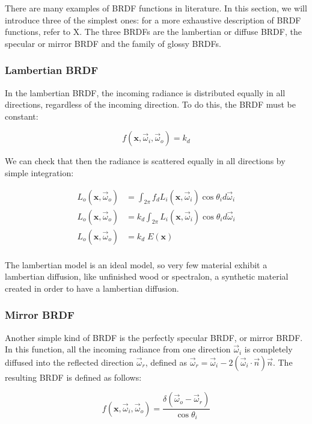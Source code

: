 There are many examples of BRDF functions in literature. In this section, we will introduce three of the simplest ones: for a more exhaustive description of BRDF functions, refer to X. The three BRDFs are the lambertian or diffuse BRDF, the specular or mirror BRDF and the family of glossy BRDFs.

\subsubsection{Lambertian BRDF}

In the lambertian BRDF, the incoming radiance is distributed equally in all directions, regardless of the incoming direction. To do this, the BRDF must be constant:

$$
f(\mathbf{x}, \vec{\omega}_i, \vec{\omega}_o) = k_d
$$

We can check that then the radiance is scattered equally in all directions by simple integration:

\begin{equation*}
\begin{split}
L_o(\mathbf{x}, \vec{\omega}_o) &= \int_{2\pi} f_d L_i(\mathbf{x}, \vec{\omega}_i) \cos\theta_i d\vec{\omega}_i \\
L_o(\mathbf{x}, \vec{\omega}_o) &= k_d \int_{2\pi} L_i(\mathbf{x}, \vec{\omega}_i) \cos\theta_i d\vec{\omega}_i \\
L_o(\mathbf{x}, \vec{\omega}_o) &= k_d \; E(\mathbf{x}) \\
\end{split}
\end{equation*}

The lambertian model is an ideal model, so very few material exhibit a lambertian diffusion, like unfinished wood or spectralon, a synthetic material created in order to have a lambertian diffusion. 

\subsubsection{Mirror BRDF}

Another simple kind of BRDF is the perfectly specular BRDF, or mirror BRDF. In this function, all the incoming radiance from one direction $\vec{\omega}_i$ is completely diffused into the reflected direction $\vec{\omega}_r$, defined as $\vec{\omega}_r = \vec{\omega}_i - 2 (\vec{\omega}_i \cdot \vec{n}) \vec{n}$. The resulting BRDF is defined as follows:

$$
f(\mathbf{x}, \vec{\omega}_i, \vec{\omega}_o) = \frac{\delta(\vec{\omega}_o - \vec{\omega}_r)}{\cos\theta_i} 
$$

